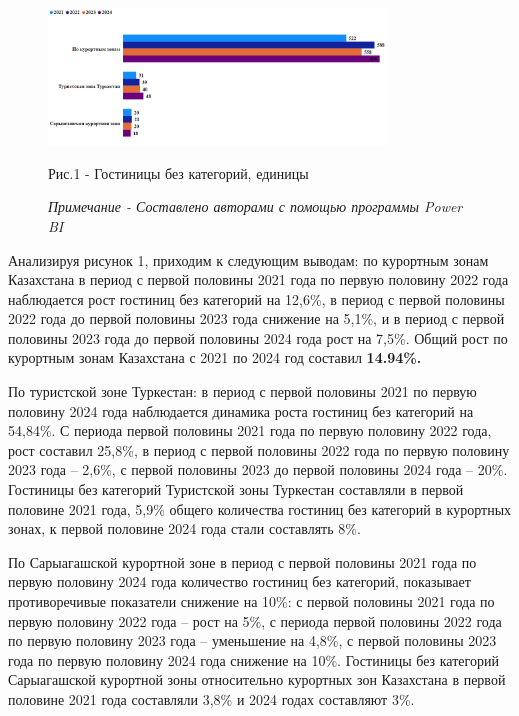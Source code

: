 \begin{figure}[H]
	\centering
	\includegraphics[width=0.8\textwidth]{media/ekon/image3}
	\caption*{Рис.1 - Гостиницы без категорий, единицы}
	\caption*{\normalfont\emph{Примечание - Составлено авторами с помощью программы Power BI}}
\end{figure}

\begin{multicols}{2}
Анализируя рисунок 1, приходим к следующим выводам: по курортным зонам
Казахстана в период с первой половины 2021 года по первую половину 2022
года наблюдается рост гостиниц без категорий на 12,6\%, в период с
первой половины 2022 года до первой половины 2023 года снижение на
5,1\%, и в период с первой половины 2023 года до первой половины 2024
года рост на 7,5\%. Общий рост по курортным зонам Казахстана с 2021 по
2024 год составил {\bfseries 14.94\%.}

По туристской зоне Туркестан: в период с первой половины 2021 по первую
половину 2024 года наблюдается динамика роста гостиниц без категорий на
54,84\%. С периода первой половины 2021 года по первую половину 2022
года, рост составил 25,8\%, в период с первой половины 2022 года по
первую половину 2023 года -- 2,6\%, с первой половины 2023 до первой
половины 2024 года -- 20\%. Гостиницы без категорий Туристской зоны
Туркестан составляли в первой половине 2021 года, 5,9\% общего
количества гостиниц без категорий в курортных зонах, к первой половине
2024 года стали составлять 8\%.

По Сарыагашской курортной зоне в период с первой половины 2021 года по
первую половину 2024 года количество гостиниц без категорий, показывает
противоречивые показатели снижение на 10\%: с первой половины 2021 года
по первую половину 2022 года -- рост на 5\%, с периода первой половины
2022 года по первую половину 2023 года -- уменьшение на 4,8\%, с первой
половины 2023 года по первую половину 2024 года снижение на 10\%.
Гостиницы без категорий Сарыагашской курортной зоны относительно
курортных зон Казахстана в первой половине 2021 года составляли 3,8\% и
2024 годах составляют 3\%.


\end{multicols}
